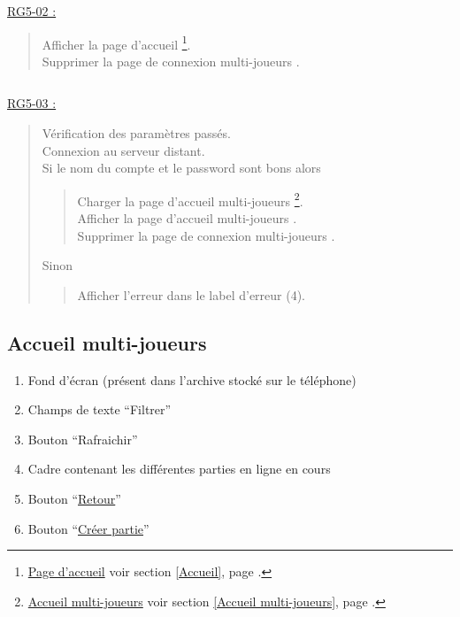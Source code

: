 \documentclass{report}
\begin{document}
				
			\underline{RG5-02 :}
				\begin{quote}
					Afficher la page d'accueil%
						\footnote[3]{
							\hyperlink{Page d'accueil}{Page d'accueil}
							\og voir section \ref{Accueil}, page \pageref{Accueil}.\fg
						}.\\
					Supprimer la page de connexion multi-joueurs \footnotemark[2].		
				\end{quote}	
				
			$\,$
				
			\underline{RG5-03 :}
				\begin{quote}
					Vérification des paramètres passés.\\
					Connexion au serveur distant.\\
					Si le nom du compte et le password sont bons alors
					\begin{quote}					
						Charger la page d'accueil multi-joueurs%
							\footnote[4]{
								\hyperlink{Accueil multi-joueurs}{Accueil multi-joueurs}
								\og voir section \ref{Accueil multi-joueurs}, page \pageref{Accueil multi-joueurs}.\fg
							}.\\
						Afficher la page d'accueil multi-joueurs \footnotemark[4].\\
						Supprimer la page de connexion multi-joueurs \footnotemark[2].
					\end{quote}	
					Sinon
					\begin{quote}
						Afficher l'erreur dans le label d'erreur (4).
					\end{quote}					
				\end{quote}	

\newpage

	\subsection{Accueil multi-joueurs}

		\hypertarget{Accueil multi-joueurs}{}
		\label{Accueil multi-joueurs}

		\begin{center}
			
		\end{center}

		\begin{enumerate}
		  \item Fond d'écran (présent dans l'archive stocké sur le téléphone)
		  \item Champs de texte ``Filtrer''
		  \item Bouton ``Rafraichir''
		  \item Cadre contenant les différentes parties en ligne en cours
		  \item Bouton ``\hyperlink{Accueil}{Retour}''
		  \item Bouton ``\hyperlink{Creer partie multi-joueurs}{Créer partie}''
		\end{enumerate}
\end{document}
